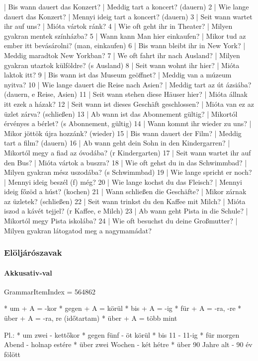 \documentclass{article}
\newenvironment{desc}{\verbatim}{\endverbatim}
\newenvironment{exmp}{\verbatim}{\endverbatim}
\begin{document}
\begin{exmp}
1 | Bis wann dauert das Konzert? | Meddig tart a koncert? (dauern)
2 | Wie lange dauert das Konzert? | Mennyi ideig tart a koncert? (dauern)
3 | Seit wann wartet ihr auf uns? | Mióta vártok ránk?
4 | Wie oft geht ihr in Theater? | Milyen gyakran mentek színházba?
5 | Wann kann Man hier einkaufen? | Mikor tud az ember itt bevásárolni? (man, einkaufen)
6 | Bis wann bleibt ihr in New York? | Meddig maradtok New Yorkban?
7 | We oft fahrt ihr nach Ausland? | Milyen gyakran utaztok külföldre? (s Ausland)
8 | Seit wann wohnt ihr hier? | Mióta laktok itt?
9 | Bis wann ist das Museum geöffnet? | Meddig van a múzeum nyitva?
10 | Wie lange dauert die Reise nach Asien? | Meddig tart az út ázsiába? (dauern, e Reise, Asien)
11 | Seit wann stehen diese Häuser hier? | Mióta állnak itt ezek a házak?
12 | Seit wann ist dieses Geschäft geschlossen? | Mióta van ez az üzlet zárva? (schließen)
13 | Ab wann ist das Abonnement gültig? | Mikortól érvényes a bérlet? (s Abonnement, gültig)
14 | Wann kommt ihr wieder zu uns? | Mikor jöttök újra hozzánk? (wieder)
15 | Bis wann dauert der Film? | Meddig tart a film? (dauern)
16 | Ab wann geht dein Sohn in den Kindergarren? | Mikortól megy a fiad az óvodába? (r Kindergarten)
17 | Seit wann wartet ihr auf den Bus? | Mióta vártok a buszra?
18 | Wie oft gehst du in das Schwimmbad? | Milyen gyakran mész uszodába? (s Schwimmbad)
19 | Wie lange spricht er noch? | Mennyi ideig beszél (f) még?
20 | Wie lange kochst du das Fleisch? | Mennyi ideig főzöd a húst? (kochen)
21 | Wann schließen die Geschäfte? | Mikor zárnak az üzletek? (schließen)
22 | Seit wann trinkst du den Kaffee mit Milch? | Mióta iszod a kávét tejjel? (r Kaffee, e Milch) 
23 | Ab wann geht Pista in die Schule? | Mikortól megy Pista iskolába?
24 | Wie oft besuchst du deine Großmutter? | Milyen gyakran látogatod meg a nagymamádat?
\end{exmp}

\subsubsection{Elöljárószavak}

\paragraph{Akkusativ-val}

GrammarItemIndex = 564862

\begin{desc}
* um + A = -kor
* gegen + A = körül
* bis + A = -ig
* für + A = -ra, -re
* über + A = -ra, re (időtartam)
* über + A = több mint

Pl.: * um zwei - kettőkor
* gegen fünf - öt körül
* bis 11 - 11-ig
* für morgen Abend - holnap estére
* über zwei Wochen - két hétre
* über 90 Jahre alt - 90 év fölött
\end{desc}
\end{document}

